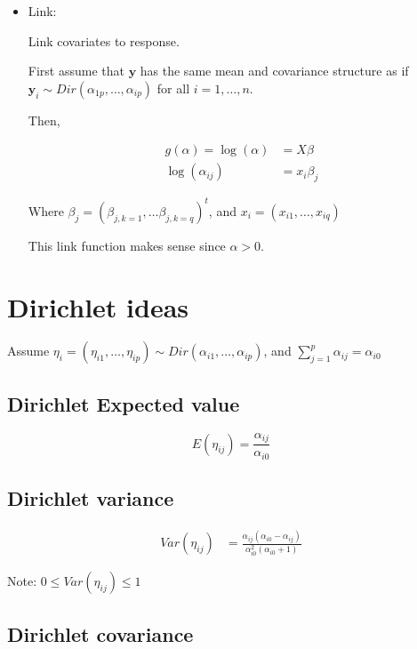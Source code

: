 \documentclass[10pt]{article}
\theoremstyle{definition}
\begin{document}
\begin{itemize}
   \item Link:

   Link covariates to response.

   First assume that $\textbf{y}$ has the same mean and covariance structure as if $\textbf{y}_i \sim Dir(\alpha_{1p}, \ldots , \alpha_{ip})$ for all $i = 1, \ldots, n$.

   Then,

   \begin{align*}
     g(\alpha) = \log(\alpha) &= X \beta \\
     \log(\alpha_{ij}) &= x_{i} \beta_{j}
   \end{align*}

Where $\beta_j = (\beta_{j, k = 1}, \ldots \beta_{j, k = q})^t$, and $x_i = (x_{i1}, \ldots , x_{iq})$

This link function makes sense since $\alpha > 0$.

\end{itemize}





\section{Dirichlet ideas }

Assume $\eta_i = (\eta_{i1}, \ldots , \eta_{ip}) \sim Dir(\alpha_{i1}, \ldots , \alpha_{ip})$, and $\sum_{j=1}^p \alpha_{ij} = \alpha_{i0}$

\subsection{Dirichlet Expected value}

\[E(\eta_{ij}) = \frac{\alpha_{ij}}{\alpha_{i0}} \]


\subsection{Dirichlet variance }

\begin{align*}
  Var(\eta_{ij}) &= \frac{\alpha_{ij}(\alpha_{i0} - \alpha_{ij})}{\alpha_{i0}^2(\alpha_{i0} + 1)}
\end{align*}

Note: $0 \leq Var(\eta_{ij}) \leq 1$

\subsection{Dirichlet covariance }
\end{document}
